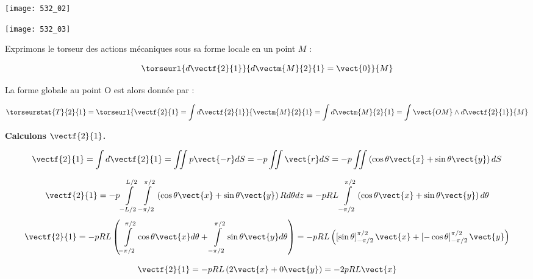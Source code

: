 \begin{center}
\texttt{[image: 532\_02]}
\end{center}

\fi




\ifprof
\else
\begin{center}
\texttt{[image: 532\_03]}
\end{center}
\fi




\ifprof

Exprimons le torseur des actions mécaniques sous sa forme locale en un point $M$ : 

$$
\torseurl{d\vectf{2}{1}}{d\vectm{M}{2}{1}=\vect{0}}{M}
$$

La forme globale au point O est alors donnée par :

$$
\torseurstat{T}{2}{1} = \torseurl{\vectf{2}{1} = \int d\vectf{2}{1}}{\vectm{M}{2}{1} = \int d\vectm{M}{2}{1}= \int \vect{OM}\wedge d\vectf{2}{1}}{M}
$$

\vspace{.5cm}

\textbf{Calculons $\vectf{2}{1}$.}

$$
\vectf{2}{1} = \int d\vectf{2}{1} = \iint p \vect{-r} dS = -p \iint  \vect{r} dS
= -p \iint  \left(\cos\theta\vect{x}+\sin\theta\vect{y} \right) dS $$

$$
\vectf{2}{1}
= -p \int\limits_{-L/2}^{L/2} \int\limits_{-\pi/2}^{\pi/2}   \left(\cos\theta\vect{x}+\sin\theta\vect{y} \right) Rd\theta dz
= -p R L \int\limits_{-\pi/2}^{\pi/2}   \left(\cos\theta\vect{x}+\sin\theta\vect{y} \right) d\theta 
$$
$$
\vectf{2}{1}
= -p R L \left(\int\limits_{-\pi/2}^{\pi/2}   \cos\theta\vect{x}d\theta + \int\limits_{-\pi/2}^{\pi/2} \sin\theta\vect{y} d\theta \right)
= -p R L \left(\left[\sin\theta \right]_{-\pi/2}^{\pi/2}\vect{x}
+\left[ -\cos\theta\right]_{-\pi/2}^{\pi/2}\vect{y}
\right)
$$

$$
\vectf{2}{1}
= -p R L \left(2\vect{x}
+0\vect{y}
\right) = -2pRL\vect{x}
$$

